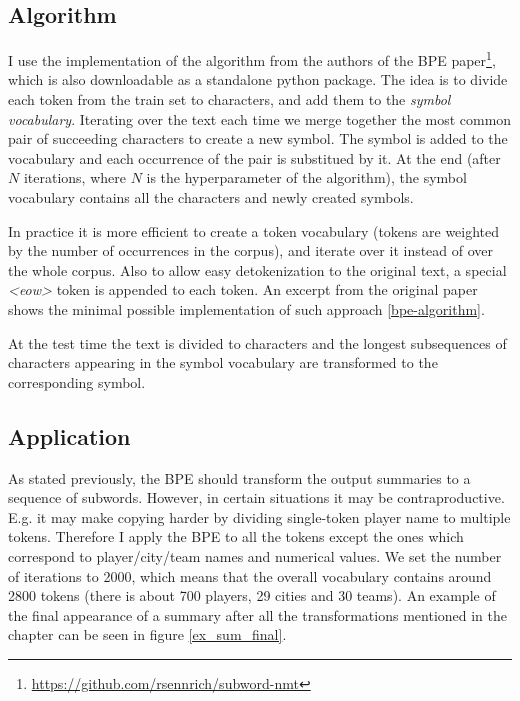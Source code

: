 \subsection{Algorithm}

I use the implementation of the algorithm from the authors of the BPE paper\footnote{\url{https://github.com/rsennrich/subword-nmt}}, which is also downloadable as a standalone python package. The idea is to divide each token from the train set to characters, and add them to the \emph{symbol vocabulary}. Iterating over the text each time we merge together the most common pair of succeeding characters to create a new symbol. The symbol is added to the vocabulary and each occurrence of the pair is substitued by it. At the end (after $N$ iterations, where $N$ is the hyperparameter of the algorithm), the symbol vocabulary contains all the characters and newly created symbols.

In practice it is more efficient to create a token vocabulary (tokens are weigh\-ted by the number of occurrences in the corpus), and iterate over it instead of over the whole corpus. Also to allow easy detokenization to the original text, a special \emph{\textless eow\textgreater} token is appended to each token. An excerpt from the original paper shows the minimal possible implementation of such approach \ref{bpe-algorithm}.

At the test time the text is divided to characters and the longest subsequences of characters appearing in the symbol vocabulary are transformed to the corresponding symbol.

\subsection{Application}

As stated previously, the BPE should transform the output summaries to a sequence of subwords. However, in certain situations it may be contraproductive. E.g. it may make copying harder by dividing single-token player name to multiple tokens. Therefore I apply the BPE to all the tokens except the ones which correspond to player/city/team names and numerical values. We set the number of iterations to 2000, which means that the overall vocabulary contains around 2800 tokens (there is about 700 players, 29 cities and 30 teams). An example of the final appearance of a summary after all the transformations mentioned in the chapter can be seen in figure \ref{ex_sum_final}. 

